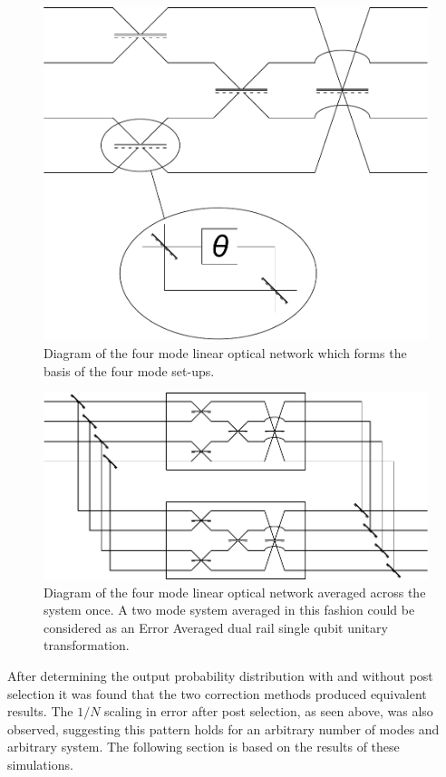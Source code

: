 \documentclass[aps,pra,twocolumn,superscriptaddress,numerical,floatfix]{revtex4-1}
\begin{document}
\begin{figure}[h]
\centerline{\includegraphics[width=\columnwidth]{4_mode_system.pdf}}
\caption{Diagram of the four mode linear optical network which forms the basis of the four mode set-ups. \label{fig:4 mode basis diagram}}
\end{figure}

\begin{figure}[h]
\centerline{\includegraphics[width=\columnwidth]{4_mode_average_across.pdf}}
\caption{Diagram of the four mode linear optical network averaged across the system once. A two mode system averaged in this fashion could be considered as an Error Averaged dual rail single qubit unitary transformation. \label{fig: averaging 4 mode diagram}}
\end{figure}

After determining the output probability distribution with and without post selection it was found that the two correction methods produced equivalent results. The $1/N$ scaling in error after post selection, as seen above, was also observed, suggesting this pattern holds for an arbitrary number of modes and arbitrary system. The following section is based on the results of these simulations.
\end{document}
